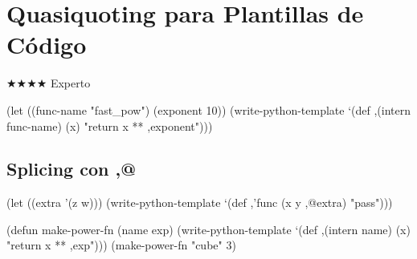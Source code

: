 \chapter{Quasiquoting para Plantillas de Código}
\label{chap:quasiquoting-templates}
{\huge$\bigstar$}{\huge$\bigstar$}{\huge$\bigstar$}{\huge$\bigstar$} Experto

\begin{lispcode}
(let ((func-name "fast_pow") (exponent 10))
  (write-python-template
    `(def ,(intern func-name) (x) "return x ** ,exponent")))
\end{lispcode}

\section{Splicing con ,@}
\begin{lispcode}
(let ((extra '(z w)))
  (write-python-template `(def ,'func (x y ,@extra) "pass")))
\end{lispcode}

\begin{examplebox}[title=Generador de funciones]
\begin{lispcode}
(defun make-power-fn (name exp)
  (write-python-template
    `(def ,(intern name) (x) "return x ** ,exp")))
(make-power-fn "cube" 3)
\end{lispcode}
\end{examplebox}

